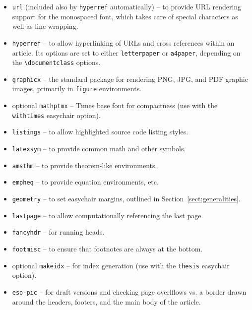 \documentclass[withtimes]{easychair}
\newcommand{\easychair}{\textsf{easychair}}
\begin{document}
\begin{itemize}
\item
\texttt{url} \cite{url-package} (included also by \texttt{hyperref} automatically) -- to provide URL rendering support for the
monospaced font, which takes care of special characters as well as line 
wrapping.

\item
\texttt{hyperref} \cite{hyperref-package} -- to allow hyperlinking of URLs and
cross references within an article.
Its options are set to either \verb+letterpaper+ or \verb+a4paper+, depending
on the \verb+\documentclass+ options.

\item
\texttt{graphicx} \cite{graphicx-package} -- the standard package for rendering
PNG, JPG, and PDF graphic images, primarily in \texttt{figure} environments.

\item
optional \texttt{mathptmx} \cite{mathptmx-package} -- Times base font for compactness
(use with the \texttt{withtimes} {\easychair} option).

\item
\texttt{listings} \cite{listings-package} -- to allow highlighted source code 
listing styles.

\item
\texttt{latexsym} \cite{latexsym-package} -- to provide common math and other 
symbols.

\item
\texttt{amsthm} \cite{amsthm-package} -- to provide {\AmS} theorem-like 
environments.

\item
\texttt{empheq} \cite{empheq-package} -- to provide equation environments, etc.

\item
\texttt{geometry} \cite{geometry-package} -- to set {\easychair} margins, 
outlined in Section~\ref{sect:generalities}.

\item
\texttt{lastpage} \cite{lastpage-package} -- to allow computationally
referencing the last page.

\item
\texttt{fancyhdr} \cite{fancyhdr-package} -- for running heads.

\item
\texttt{footmisc} \cite{footmisc-package} -- to ensure that footnotes are
always at the bottom.

\item
optional \texttt{makeidx} \cite{makeidx-package} -- for index generation
(use with the \texttt{thesis} {\easychair} option).

\item
\texttt{eso-pic} \cite{eso-pic-package} -- for draft versions and checking page
overlflows vs. a border drawn around the headers, footers, and the main body of
the article.

\end{itemize}
\end{document}
